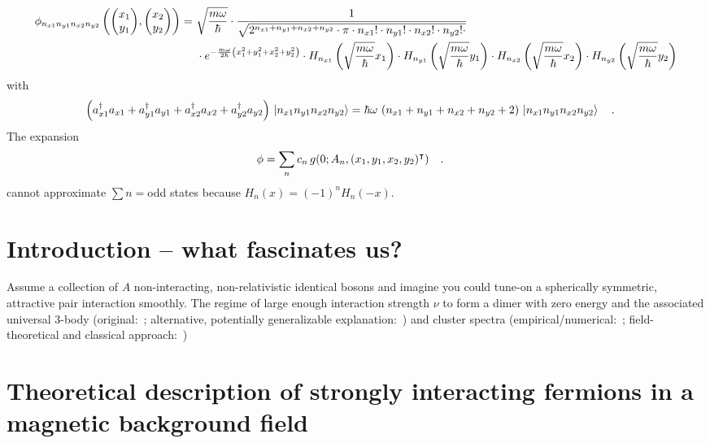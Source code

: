 \documentclass[
reprint,
onecolumn,
nofootinbib,
amsmath,amssymb,
aps,
]{revtex4-2}
\newcommand{\be} {\begin{equation}}
\newcommand{\ee} {\end{equation}}
\begin{document}
\begin{align}
\phi_{n_{x1}n_{y1}n_{x2}n_{y2}}\left(\mqty(x_1\\y_1),\mqty(x_2\\y_2)\right)=
&~
\sqrt{\frac{m\omega}{\hbar}}
\cdot
\frac{1}{\sqrt{2^{n_{x1}+n_{y1}+n_{x2}+n_{y2}}\cdot\pi\cdot n_{x1}!\cdot n_{y1}!\cdot n_{x2}!\cdot n_{y2}!\cdot }}\nonumber\\
&~
\cdot e^{-\frac{m\omega}{2\hbar}\left(x_1^2+y_1^2+x_2^2+y_2^2\right)}
\cdot H_{n_{x1}}\left(\sqrt{\frac{m\omega}{\hbar}}x_1\right)
\cdot H_{n_{y1}}\left(\sqrt{\frac{m\omega}{\hbar}}y_1\right)
\cdot H_{n_{x2}}\left(\sqrt{\frac{m\omega}{\hbar}}x_2\right)
\cdot H_{n_{y2}}\left(\sqrt{\frac{m\omega}{\hbar}}y_2\right)
\end{align}
with
\begin{align}
\left(a_{x1}^\dagger a_{x1}+ a_{y1}^\dagger a_{y1}+ a_{x2}^\dagger a_{x2}+ a_{y2}^\dagger a_{y2}\right)
\,
\ket{n_{x1}n_{y1}n_{x2}n_{y2}}
=
\hbar\omega\,
\left(
n_{x1}+n_{y1}+n_{x2}+n_{y2}+2
\right)
\,
\ket{n_{x1}n_{y1}n_{x2}n_{y2}}
\qq{.}
\end{align}
The expansion
\be
\phi=\sum\limits_n c_n\,g(0;A_n,(x_1,y_1,x_2,y_2)^\intercal)\qq{.}
\ee
cannot approximate \(\sum n=\)odd states because \(H_n(x)=(-1)^nH_n(-x)\).

\section{Introduction -- what fascinates us?}

Assume a collection of $A$ non-interacting, non-relativistic identical bosons and imagine you could
tune-on a spherically symmetric, attractive pair interaction smoothly. The regime of large enough interaction strength $\nu$
to form a dimer with zero energy and the associated universal 
3-body (original:~\cite{Efimov:1971zz,Efimov:1973awb}; alternative, potentially generalizable explanation:~\cite{AMADO197125,Adhikari:1972par}) and 
cluster spectra (empirical/numerical:~\cite{von_Stecher_2010,PhysRevLett.107.200402,2014FBS....55.1245H,PhysRevA.90.012502,PhysRevA.92.033626,article};
field-theoretical and classical approach:~\cite{Son:2021kkx,Wang:2024qcg})



\section{Theoretical description of strongly interacting fermions in a magnetic
background field}
\end{document}
